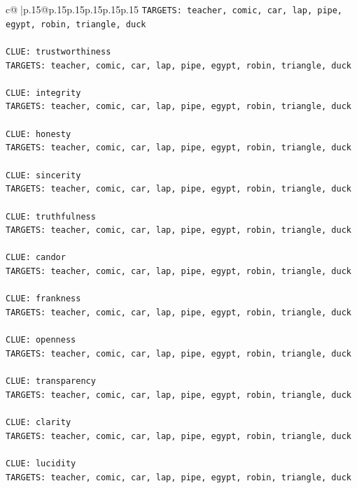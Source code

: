 \documentclass{article}
\begin{document}
{\begin{supertabular}{c@{$\;$}|p{.15\linewidth}@{}p{.15\linewidth}p{.15\linewidth}p{.15\linewidth}p{.15\linewidth}p{.15\linewidth}}
{{{\texttt{TARGETS: teacher, comic, car, lap, pipe, egypt, robin, triangle, duck} \\
\\ 
\texttt{CLUE: trustworthiness} \\
\texttt{TARGETS: teacher, comic, car, lap, pipe, egypt, robin, triangle, duck} \\
\\ 
\texttt{CLUE: integrity} \\
\texttt{TARGETS: teacher, comic, car, lap, pipe, egypt, robin, triangle, duck} \\
\\ 
\texttt{CLUE: honesty} \\
\texttt{TARGETS: teacher, comic, car, lap, pipe, egypt, robin, triangle, duck} \\
\\ 
\texttt{CLUE: sincerity} \\
\texttt{TARGETS: teacher, comic, car, lap, pipe, egypt, robin, triangle, duck} \\
\\ 
\texttt{CLUE: truthfulness} \\
\texttt{TARGETS: teacher, comic, car, lap, pipe, egypt, robin, triangle, duck} \\
\\ 
\texttt{CLUE: candor} \\
\texttt{TARGETS: teacher, comic, car, lap, pipe, egypt, robin, triangle, duck} \\
\\ 
\texttt{CLUE: frankness} \\
\texttt{TARGETS: teacher, comic, car, lap, pipe, egypt, robin, triangle, duck} \\
\\ 
\texttt{CLUE: openness} \\
\texttt{TARGETS: teacher, comic, car, lap, pipe, egypt, robin, triangle, duck} \\
\\ 
\texttt{CLUE: transparency} \\
\texttt{TARGETS: teacher, comic, car, lap, pipe, egypt, robin, triangle, duck} \\
\\ 
\texttt{CLUE: clarity} \\
\texttt{TARGETS: teacher, comic, car, lap, pipe, egypt, robin, triangle, duck} \\
\\ 
\texttt{CLUE: lucidity} \\
\texttt{TARGETS: teacher, comic, car, lap, pipe, egypt, robin, triangle, duck} \\
}}}
\end{supertabular}}
\end{document}
